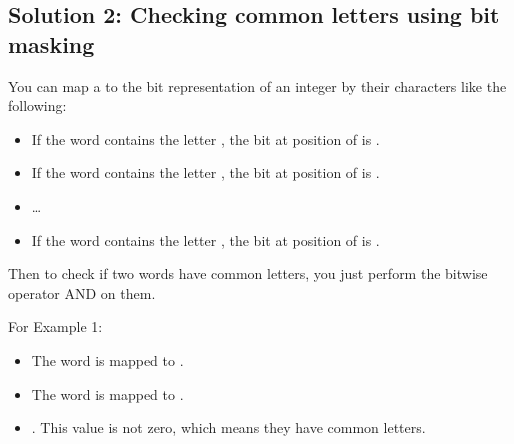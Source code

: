 \documentclass[letterpaper,12pt,english]{book}
\begin{document}
\subsection{Solution 2: Checking common letters using bit masking}
\label{\detokenize{Mathematics/09_MTH_318_Maximum_Product_of_Word_Lengths:solution-2-checking-common-letters-using-bit-masking}}
\sphinxAtStartPar
You can map a  to the bit representation of an integer  by their characters like the following:
\begin{itemize}
\item {} 
\sphinxAtStartPar
If the word  contains the letter , the bit at position  of  is .

\item {} 
\sphinxAtStartPar
If the word  contains the letter , the bit at position  of  is .

\item {} 
\sphinxAtStartPar
…

\item {} 
\sphinxAtStartPar
If the word  contains the letter , the bit at position  of  is .

\end{itemize}

\sphinxAtStartPar
Then to check if two words have common letters, you just perform the bitwise operator AND on them.

\sphinxAtStartPar
For Example 1:
\begin{itemize}
\item {} 
\sphinxAtStartPar
The word  is mapped to .

\item {} 
\sphinxAtStartPar
The word  is mapped to .

\item {} 
\sphinxAtStartPar
{}. This value is not zero, which means they have common letters.

\end{itemize}
\end{document}
